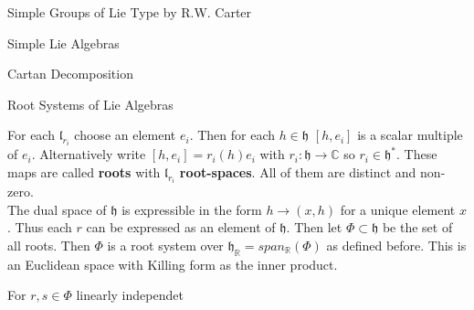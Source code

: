 \documentclass[12pt, letterpaper]{article}
\newcommand{\R}{\mathbb{R}}
\newcommand{\C}{\mathbb{C}}
\begin{document}
\begin{section}{Simple Groups of Lie Type by R.W. Carter}
\begin{subsection}{Simple Lie Algebras}
\begin{subsubsection}{Cartan Decomposition}
    \end{subsubsection}

    \begin{subsubsection}{Root Systems of Lie Algebras}

      For each \(\mathfrak{l}_{r_{i}}\) choose an element \(e_{i}\). Then for
      each \(h \in \mathfrak{h}\) \([h, e_{i}]\) is a scalar multiple of
      \(e_{i}\). Alternatively write \([h, e_{i}] = r_{i}(h) e_{i}\) with
      \(r_{i}: \mathfrak{h} \to \C\) so \(r_{i} \in \mathfrak{h}^{*}\). These
      maps are called \textbf{roots} with \(\mathfrak{l}_{r_{i}}\)
      \textbf{root-spaces}. All of them are distinct and non-zero. \\
      The dual space of \(\mathfrak{h}\) is expressible in the form
      \(h \to (x, h)\) for a unique element \(x\). Thus each \(r\) can be
      expressed as an element of \(\mathfrak{h}\). Then let \(\Phi \subset
      \mathfrak{h}\) be the set of all roots. Then \(\Phi\) is a root system
      over \(\mathfrak{h}_{\R} = span_{\R}(\Phi)\) as defined before. This is an
      Euclidean space with Killing form as the inner product.

      For \(r, s \in \Phi\) linearly independet

    \end{subsubsection}

  \end{subsection}

\end{section}
\end{document}
